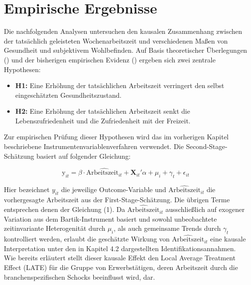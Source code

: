 \documentclass[12pt,a4paper]{article}
\begin{document}

\section{Empirische Ergebnisse}
Die nachfolgenden Analysen untersuchen den kausalen Zusammenhang zwischen der tatsächlich geleisteten Wochenarbeitszeit und verschiedenen Maßen von Gesundheit und subjektivem Wohlbefinden. Auf Basis theoretischer Überlegungen (\cite{becker1965,grossman1972}) und der bisherigen empirischen Evidenz (\cite{cyganrehm2018,berniell2020,holly2012}) ergeben sich zwei zentrale Hypothesen:

\begin{itemize}
    \item \textbf{H1:} Eine Erhöhung der tatsächlichen Arbeitszeit verringert den selbst eingeschätzten Gesundheitszustand.
    \item \textbf{H2:} Eine Erhöhung der tatsächlichen Arbeitszeit senkt die Lebenszufriedenheit und die Zufriedenheit mit der Freizeit.
\end{itemize}

Zur empirischen Prüfung dieser Hypothesen wird das im vorherigen Kapitel beschriebene Instrumentenvariablenverfahren verwendet. Die Second-Stage-Schätzung basiert auf folgender Gleichung:

\begin{equation}
    \text{y}_{it} = \beta\cdot\widehat{\text{Arbeitszeit}_{it}}+\boldsymbol{X}_{it}'\alpha+\mu_i+\gamma_{t}+\epsilon_{it}
\end{equation}

Hier bezeichnet \( y_{it} \) die jeweilige Outcome-Variable und \( \widehat{\text{Arbeitszeit}}_{it} \) die vorhergesagte Arbeitszeit aus der First-Stage-Schätzung. Die übrigen Terme entsprechen denen der Gleichung (1). Da $\widehat{\text{Arbeitszeit}}_{it}$ ausschließlich auf exogener Variation aus dem Bartik-Instrument basiert und sowohl unbeobachtete zeitinvariante Heterogenität durch $\mu_i$, als auch gemeinsame Trends durch $\gamma_t$ kontrolliert werden, erlaubt die geschätzte Wirkung von $\widehat{\text{Arbeitszeit}}_{it}$ eine kausale Interpretation unter den in Kapitel 4.2 dargestellten Identifikationsannahmen. Wie bereits erläutert stellt dieser kausale Effekt den Local Average Treatment Effect (LATE) für die Gruppe von Erwerbstätigen, deren Arbeitszeit durch die branchenspezifischen Schocks beeinflusst wird, dar. 
\end{document}
